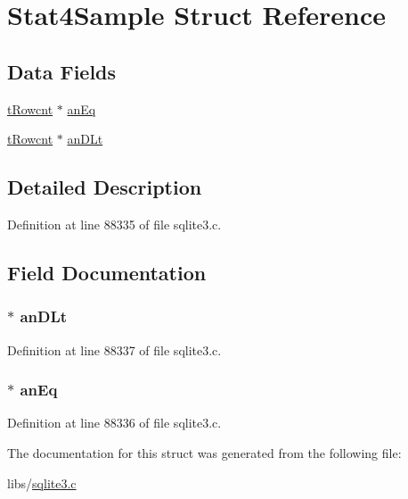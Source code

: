 \hypertarget{struct_stat4_sample}{}\section{Stat4\+Sample Struct Reference}
\label{struct_stat4_sample}
\subsection*{Data Fields}
\begin{DoxyCompactItemize}
\item 
\hyperlink{sqlite3_8c_a6de101211e945e499510b624a65c28a4}{t\+Rowcnt} $\ast$ \hyperlink{struct_stat4_sample_a5469081a172819424771bb89f5dc97e8}{an\+Eq}
\item 
\hyperlink{sqlite3_8c_a6de101211e945e499510b624a65c28a4}{t\+Rowcnt} $\ast$ \hyperlink{struct_stat4_sample_a0f509d3eb7d4f182e39273ce03e5e197}{an\+D\+Lt}
\end{DoxyCompactItemize}


\subsection{Detailed Description}


Definition at line 88335 of file sqlite3.\+c.



\subsection{Field Documentation}
\hypertarget{struct_stat4_sample_a0f509d3eb7d4f182e39273ce03e5e197}{}
\subsubsection[{an\+D\+Lt}]{$\ast$ an\+D\+Lt}\label{struct_stat4_sample_a0f509d3eb7d4f182e39273ce03e5e197}


Definition at line 88337 of file sqlite3.\+c.

\hypertarget{struct_stat4_sample_a5469081a172819424771bb89f5dc97e8}{}
\subsubsection[{an\+Eq}]{$\ast$ an\+Eq}\label{struct_stat4_sample_a5469081a172819424771bb89f5dc97e8}


Definition at line 88336 of file sqlite3.\+c.



The documentation for this struct was generated from the following file\+:\begin{DoxyCompactItemize}
\item 
libs/\hyperlink{sqlite3_8c}{sqlite3.\+c}\end{DoxyCompactItemize}
